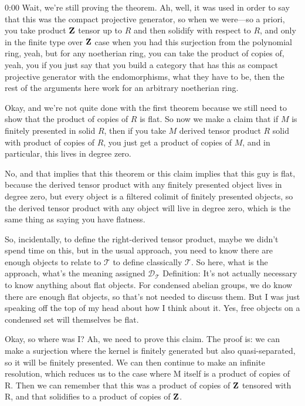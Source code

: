 \begin{unfinished}{0:00}
Wait, we're still proving the theorem. Ah, well, it was used in order to say that this was the compact projective generator, so when we were---so a priori, you take product $\mathbf Z$ tensor up to $R$ and then solidify with respect to $R$, and only in the finite type over $\mathbf Z$ case when you had this surjection from the polynomial ring, yeah, but for any noetherian ring, you can take the product of copies of, yeah, you if you just say that you build a category that has this as compact projective generator with the endomorphisms, what they have to be, then the rest of the arguments here work for an arbitrary noetherian ring.

Okay, and we're not quite done with the first theorem because we still need to show that the product of copies of $R$ is flat. So now we make a claim that if $M$ is finitely presented in solid $R$, then if you take $M$ derived tensor product $R$ solid with product of copies of $R$, you just get a product of copies of $M$, and in particular, this lives in degree zero.

No, and that implies that this theorem or this claim implies that this guy is flat, because the derived tensor product with any finitely presented object lives in degree zero, but every object is a filtered colimit of finitely presented objects, so the derived tensor product with any object will live in degree zero, which is the same thing as saying you have flatness.

So, incidentally, to define the right-derived tensor product, maybe we didn't spend time on this, but in the usual approach, you need to know there are enough objects to relate to $\mathcal{T}$ to define classically $\mathcal{T}$. So here, what is the approach, what's the meaning assigned $\mathcal{D}_\mathcal{T}$
Definition: It's not actually necessary to know anything about flat objects. For condensed abelian groups, we do know there are enough flat objects, so that's not needed to discuss them. But I was just speaking off the top of my head about how I think about it. Yes, free objects on a condensed set will themselves be flat.

Okay, so where was I? Ah, we need to prove this claim. The proof is: we can make a surjection where the kernel is finitely generated but also quasi-separated, so it will be finitely presented. We can then continue to make an infinite resolution, which reduces us to the case where M itself is a product of copies of R. Then we can remember that this was a product of copies of $\mathbf Z$ tensored with R, and that solidifies to a product of copies of $\mathbf Z$. 


\end{unfinished}

